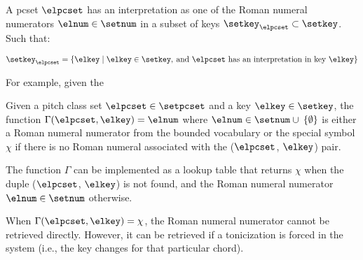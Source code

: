 
A \gls{pcset} $\elpcset$ has an interpretation as one of the
Roman numeral numerators $\elnum \in \setnum$ in a subset of
keys $\setkey_{\elpcset} \subset \setkey$. Such that:

\begin{equation}
    \setkey_{\elpcset} = \{\elkey \mid \elkey \in \setkey,
     \: \text{and $\elpcset$ has an interpretation in key $\elkey$}\}
\end{equation}

For example, given the 

Given a pitch class set $\elpcset \in \setpcset$ and a key
$\elkey \in \setkey$, the function $\Gamma(\elpcset, \elkey) =
\elnum$ where $\elnum \in \setnum \cup \: \{ \emptyset \}$ is
either a Roman numeral numerator from the bounded vocabulary
or the special symbol $\chi$ if there is no Roman numeral
associated with the ($\elpcset$, $\elkey$) pair.

The function $\Gamma$ can be implemented as a lookup table
that returns $\chi$ when the duple ($\elpcset$, $\elkey$) is not
found, and the Roman numeral numerator $\elnum \in \setnum$
otherwise.

When $\Gamma(\elpcset, \elkey) = \chi$, the Roman numeral
numerator cannot be retrieved directly. However, it can be
retrieved if a tonicization is forced in the system (i.e.,
the key changes for that particular chord).

